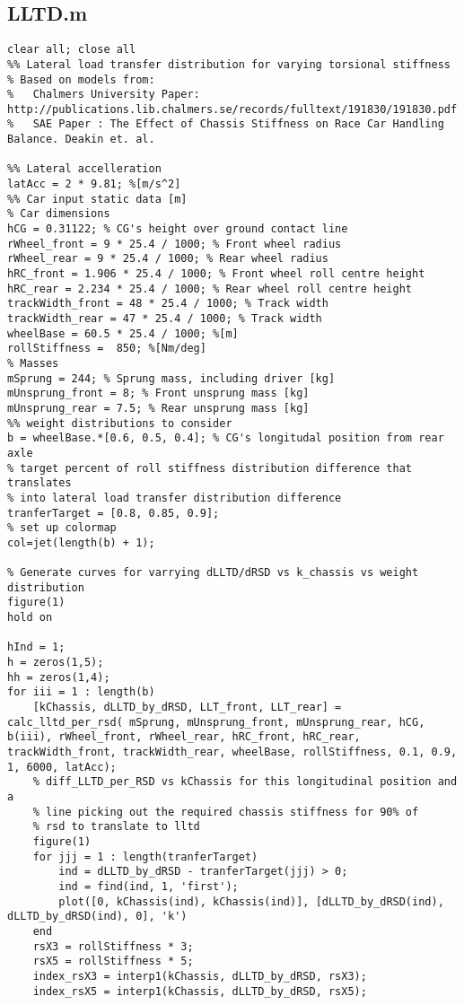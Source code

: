 		\subsection{LLTD.m}
\begin{lstlisting}
clear all; close all
%% Lateral load transfer distribution for varying torsional stiffness
% Based on models from:
%	Chalmers University Paper: http://publications.lib.chalmers.se/records/fulltext/191830/191830.pdf
%	SAE Paper : The Effect of Chassis Stiffness on Race Car Handling Balance. Deakin et. al.

%% Lateral accelleration
latAcc = 2 * 9.81; %[m/s^2]
%% Car input static data [m]
% Car dimensions
hCG = 0.31122; % CG's height over ground contact line
rWheel_front = 9 * 25.4 / 1000; % Front wheel radius
rWheel_rear = 9 * 25.4 / 1000; % Rear wheel radius
hRC_front = 1.906 * 25.4 / 1000; % Front wheel roll centre height
hRC_rear = 2.234 * 25.4 / 1000; % Rear wheel roll centre height
trackWidth_front = 48 * 25.4 / 1000; % Track width
trackWidth_rear = 47 * 25.4 / 1000; % Track width
wheelBase = 60.5 * 25.4 / 1000; %[m]
rollStiffness =  850; %[Nm/deg]
% Masses
mSprung = 244; % Sprung mass, including driver [kg]
mUnsprung_front = 8; % Front unsprung mass [kg]
mUnsprung_rear = 7.5; % Rear unsprung mass [kg]
%% weight distributions to consider
b = wheelBase.*[0.6, 0.5, 0.4]; % CG's longitudal position from rear axle
% target percent of roll stiffness distribution difference that translates 
% into lateral load transfer distribution difference
tranferTarget = [0.8, 0.85, 0.9]; 
% set up colormap
col=jet(length(b) + 1);

% Generate curves for varrying dLLTD/dRSD vs k_chassis vs weight distribution
figure(1)
hold on

hInd = 1;
h = zeros(1,5);
hh = zeros(1,4);
for iii = 1 : length(b)
	[kChassis, dLLTD_by_dRSD, LLT_front, LLT_rear] = calc_lltd_per_rsd( mSprung, mUnsprung_front, mUnsprung_rear, hCG, b(iii), rWheel_front, rWheel_rear, hRC_front, hRC_rear, trackWidth_front, trackWidth_rear, wheelBase, rollStiffness, 0.1, 0.9, 1, 6000, latAcc);
	% diff_LLTD_per_RSD vs kChassis for this longitudinal position and a
	% line picking out the required chassis stiffness for 90% of 
	% rsd to translate to lltd
	figure(1)
	for jjj = 1 : length(tranferTarget)
		ind = dLLTD_by_dRSD - tranferTarget(jjj) > 0;
		ind = find(ind, 1, 'first');
		plot([0, kChassis(ind), kChassis(ind)], [dLLTD_by_dRSD(ind), dLLTD_by_dRSD(ind), 0], 'k')
	end
	rsX3 = rollStiffness * 3;
	rsX5 = rollStiffness * 5;
	index_rsX3 = interp1(kChassis, dLLTD_by_dRSD, rsX3);
	index_rsX5 = interp1(kChassis, dLLTD_by_dRSD, rsX5);
	

\end{lstlisting}
